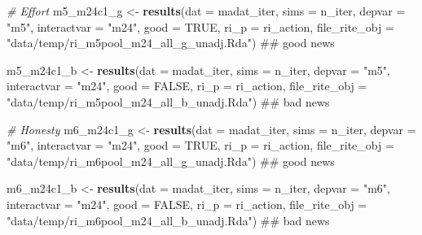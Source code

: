 \documentclass[]{article}
\newenvironment{Shaded}{\begin{snugshade}}{\end{snugshade}}
\newcommand{\KeywordTok}[1]{\textcolor[rgb]{0.13,0.29,0.53}{\textbf{#1}}}
\newcommand{\DataTypeTok}[1]{\textcolor[rgb]{0.13,0.29,0.53}{#1}}
\newcommand{\StringTok}[1]{\textcolor[rgb]{0.31,0.60,0.02}{#1}}
\newcommand{\CommentTok}[1]{\textcolor[rgb]{0.56,0.35,0.01}{\textit{#1}}}
\newcommand{\OtherTok}[1]{\textcolor[rgb]{0.56,0.35,0.01}{#1}}
\newcommand{\NormalTok}[1]{#1}
\begin{document}
\begin{Shaded}
\begin{Highlighting}[]
\CommentTok{# Effort}
\NormalTok{m5_m24c1_g <-}\StringTok{ }\KeywordTok{results}\NormalTok{(}\DataTypeTok{dat =}\NormalTok{ madat_iter, }\DataTypeTok{sims =}\NormalTok{ n_iter, }
                      \DataTypeTok{depvar =} \StringTok{"m5"}\NormalTok{, }\DataTypeTok{interactvar =} \StringTok{"m24"}\NormalTok{, }\DataTypeTok{good =} \OtherTok{TRUE}\NormalTok{, }
                      \DataTypeTok{ri_p =}\NormalTok{ ri_action, }\DataTypeTok{file_rite_obj =} \StringTok{"data/temp/ri_m5pool_m24_all_g_unadj.Rda"}\NormalTok{)  ## good news}

\NormalTok{m5_m24c1_b <-}\StringTok{ }\KeywordTok{results}\NormalTok{(}\DataTypeTok{dat =}\NormalTok{ madat_iter, }\DataTypeTok{sims =}\NormalTok{ n_iter,}
                      \DataTypeTok{depvar =} \StringTok{"m5"}\NormalTok{, }\DataTypeTok{interactvar =} \StringTok{"m24"}\NormalTok{, }\DataTypeTok{good =} \OtherTok{FALSE}\NormalTok{,}
                      \DataTypeTok{ri_p =}\NormalTok{ ri_action, }\DataTypeTok{file_rite_obj =} \StringTok{"data/temp/ri_m5pool_m24_all_b_unadj.Rda"}\NormalTok{) ## bad news}

\CommentTok{# Honesty}
\NormalTok{m6_m24c1_g <-}\StringTok{ }\KeywordTok{results}\NormalTok{(}\DataTypeTok{dat =}\NormalTok{ madat_iter, }\DataTypeTok{sims =}\NormalTok{ n_iter,}
                      \DataTypeTok{depvar =} \StringTok{"m6"}\NormalTok{, }\DataTypeTok{interactvar =} \StringTok{"m24"}\NormalTok{, }\DataTypeTok{good =} \OtherTok{TRUE}\NormalTok{,}
                      \DataTypeTok{ri_p =}\NormalTok{ ri_action, }\DataTypeTok{file_rite_obj =} \StringTok{"data/temp/ri_m6pool_m24_all_g_unadj.Rda"}\NormalTok{)  ## good news}

\NormalTok{m6_m24c1_b <-}\StringTok{ }\KeywordTok{results}\NormalTok{(}\DataTypeTok{dat =}\NormalTok{ madat_iter, }\DataTypeTok{sims =}\NormalTok{ n_iter, }
                      \DataTypeTok{depvar =} \StringTok{"m6"}\NormalTok{, }\DataTypeTok{interactvar =} \StringTok{"m24"}\NormalTok{, }\DataTypeTok{good =} \OtherTok{FALSE}\NormalTok{,}
                      \DataTypeTok{ri_p =}\NormalTok{ ri_action, }\DataTypeTok{file_rite_obj =} \StringTok{"data/temp/ri_m6pool_m24_all_b_unadj.Rda"}\NormalTok{)  ## bad news}
\end{Highlighting}
\end{Shaded}
\end{document}
